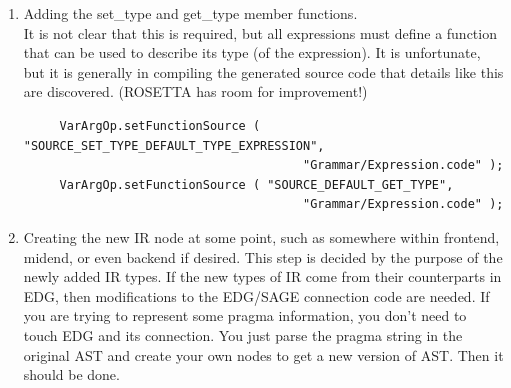 \begin{enumerate}
{{\begin{verbatim}
// ....
SOURCE_VARARG_OPERATOR_START

  SgType*
  $CLASSNAME::get_type() const
   {
     SgType* returnType = p_expression_type;
     ROSE_ASSERT(returnType != NULL);
     return returnType;
   }

  unsigned int $CLASSNAME::cfgIndexForEnd() const {
    return 1;
  }
  //....

SOURCE_VARARG_OPERATOR_END
\end{verbatim} 
 }}
           The C++ source code is extracted 
           from between the named markers (text labels) in the named file and inserted 
           into the generated source code. Using this technique, very small amounts of 
           specialized code can be tailored for each IR node, while still providing an 
           automated means of generating all the rest.  Different locations in the
           generated code can be modified with external code. Here we add the source code
           for a function.

     \item Adding the set\_type and get\_type member functions. \\
           It is not clear that this is required, but all expressions must define a
           function that can be used to describe its type (of the expression).
           It is unfortunate, but it is generally in compiling the generated source code
           that details like this are discovered.  (ROSETTA has room for improvement!)
{\indent
{\mySmallFontSize
\begin{verbatim}
     VarArgOp.setFunctionSource ( "SOURCE_SET_TYPE_DEFAULT_TYPE_EXPRESSION", 
                                       "Grammar/Expression.code" );
     VarArgOp.setFunctionSource ( "SOURCE_DEFAULT_GET_TYPE",
                                       "Grammar/Expression.code" );
\end{verbatim} 
}}

     \item Creating the new IR node at some point, such as somewhere within frontend, midend, or even backend if desired.
           This step is decided by the purpose of the newly added IR types.
           If the new types of IR come from their counterparts in EDG, then modifications to the EDG/SAGE connection code are needed.
           If you are trying to represent some pragma information, you don't need to touch EDG and its connection. 
           You just parse the pragma string in the original AST and create your own nodes to get a new version of AST. 
           Then it should be done.


\end{enumerate}
